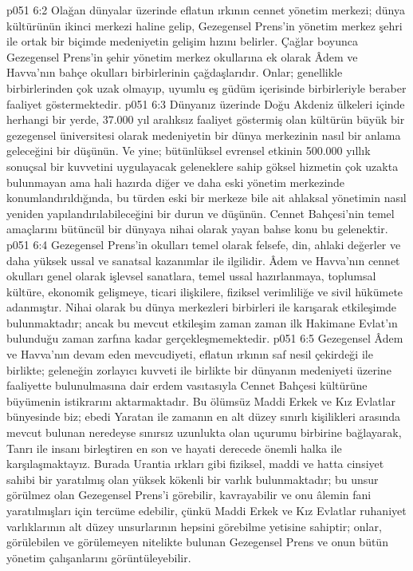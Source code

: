 \vs p051 6:2 Olağan dünyalar üzerinde eflatun ırkının cennet yönetim merkezi; dünya kültürünün ikinci merkezi haline gelip, Gezegensel Prens’in yönetim merkez şehri ile ortak bir biçimde medeniyetin gelişim hızını belirler. Çağlar boyunca Gezegensel Prens’in şehir yönetim merkez okullarına ek olarak Âdem ve Havva’nın bahçe okulları birbirlerinin çağdaşlarıdır. Onlar; genellikle birbirlerinden çok uzak olmayıp, uyumlu eş güdüm içerisinde birbirleriyle beraber faaliyet göstermektedir.
\vs p051 6:3 Dünyanız üzerinde Doğu Akdeniz ülkeleri içinde herhangi bir yerde, 37.000 yıl aralıksız faaliyet göstermiş olan kültürün büyük bir gezegensel üniversitesi olarak medeniyetin bir dünya merkezinin nasıl bir anlama geleceğini bir düşünün. Ve yine; bütünlüksel evrensel etkinin 500.000 yıllık sonuçsal bir kuvvetini uygulayacak geleneklere sahip göksel hizmetin çok uzakta bulunmayan ama hali hazırda diğer ve daha eski yönetim merkezinde konumlandırıldığında, bu türden eski bir merkeze bile ait ahlaksal yönetimin nasıl yeniden yapılandırılabileceğini bir durun ve düşünün. Cennet Bahçesi’nin temel amaçlarını bütüncül bir dünyaya nihai olarak yayan bahse konu bu gelenektir.
\vs p051 6:4 Gezegensel Prens’in okulları temel olarak felsefe, din, ahlaki değerler ve daha yüksek ussal ve sanatsal kazanımlar ile ilgilidir. Âdem ve Havva’nın cennet okulları genel olarak işlevsel sanatlara, temel ussal hazırlanmaya, toplumsal kültüre, ekonomik gelişmeye, ticari ilişkilere, fiziksel verimliliğe ve sivil hükümete adanmıştır. Nihai olarak bu dünya merkezleri birbirleri ile karışarak etkileşimde bulunmaktadır; ancak bu mevcut etkileşim zaman zaman ilk Hakimane Evlat’ın bulunduğu zaman zarfına kadar gerçekleşmemektedir.
\vs p051 6:5 Gezegensel Âdem ve Havva’nın devam eden mevcudiyeti, eflatun ırkının saf nesil çekirdeği ile birlikte; geleneğin zorlayıcı kuvveti ile birlikte bir dünyanın medeniyeti üzerine faaliyette bulunulmasına dair erdem vasıtasıyla Cennet Bahçesi kültürüne büyümenin istikrarını aktarmaktadır. Bu ölümsüz Maddi Erkek ve Kız Evlatlar bünyesinde biz; ebedi Yaratan ile zamanın en alt düzey sınırlı kişilikleri arasında mevcut bulunan neredeyse sınırsız uzunlukta olan uçurumu birbirine bağlayarak, Tanrı ile insanı birleştiren en son ve hayati derecede önemli halka ile karşılaşmaktayız. Burada Urantia ırkları gibi fiziksel, maddi ve hatta cinsiyet sahibi bir yaratılmış olan yüksek kökenli bir varlık bulunmaktadır; bu unsur görülmez olan Gezegensel Prens’i görebilir, kavrayabilir ve onu âlemin fani yaratılmışları için tercüme edebilir, çünkü Maddi Erkek ve Kız Evlatlar ruhaniyet varlıklarının alt düzey unsurlarının hepsini görebilme yetisine sahiptir; onlar, görülebilen ve görülemeyen nitelikte bulunan Gezegensel Prens ve onun bütün yönetim çalışanlarını görüntüleyebilir.
